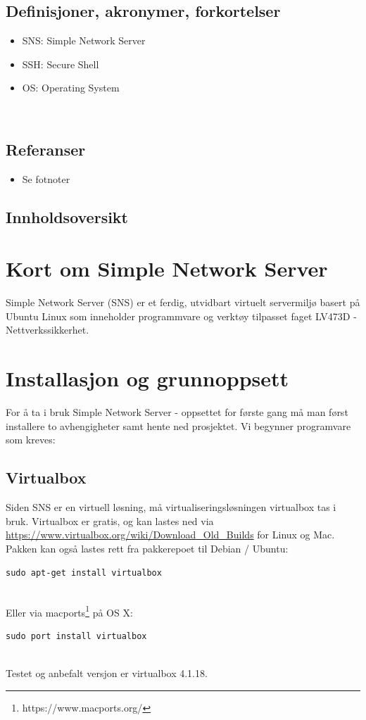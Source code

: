 \documentclass{article}
\begin{document}
\subsection{Definisjoner, akronymer, forkortelser}
\begin{itemize}
\item SNS: Simple Network Server
\item SSH: Secure Shell
\item OS: Operating System
\end{itemize}
\\
\subsection{Referanser}
\begin{itemize}
\item Se fotnoter
\end{itemize}
\subsection{Innholdsoversikt}
\section{Kort om Simple Network Server}
Simple Network Server (SNS) er et ferdig, utvidbart virtuelt servermiljø basert på Ubuntu Linux som inneholder programmvare og verktøy tilpasset faget LV473D -Nettverkssikkerhet. 
\section{Installasjon og grunnoppsett}
For å ta i bruk Simple Network Server - oppsettet for første gang må man først installere to avhengigheter samt hente ned prosjektet. Vi begynner programvare som kreves:
\subsection{Virtualbox}
Siden SNS er en virtuell løsning, må virtualiseringsløsningen virtualbox tas i bruk. Virtualbox er gratis, og kan lastes ned via \url{https://www.virtualbox.org/wiki/Download_Old_Builds} for Linux og Mac. Pakken kan også lastes rett fra pakkerepoet til Debian / Ubuntu: \\ 
\begin{lstlisting}
sudo apt-get install virtualbox
\end{lstlisting}
\\
Eller via macports\footnote{https://www.macports.org/} på OS X:
\begin{lstlisting}
sudo port install virtualbox
\end{lstlisting}
\\
Testet og anbefalt versjon er virtualbox 4.1.18. 
\end{document}

